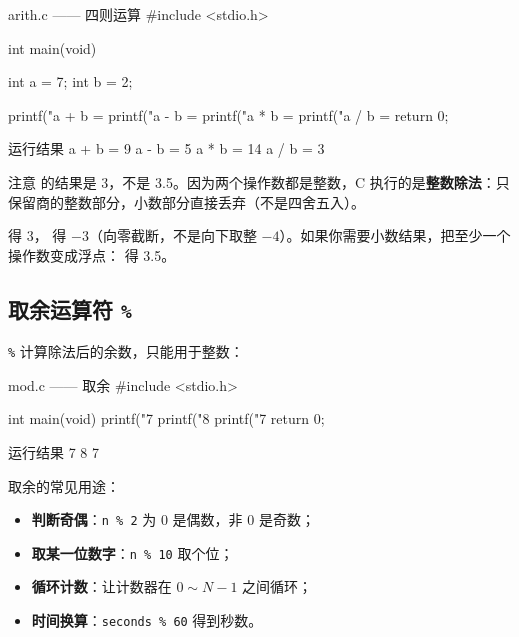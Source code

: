 \begin{codebox}{arith.c —— 四则运算}
#include <stdio.h>

int main(void)
{
    int a = 7;
    int b = 2;

    printf("a + b = %
    printf("a - b = %
    printf("a * b = %
    printf("a / b = %
    return 0;
}
\end{codebox}

\begin{outbox}{运行结果}
a + b = 9
a - b = 5
a * b = 14
a / b = 3
\end{outbox}

注意  的结果是 3，不是 3.5。因为两个操作数都是整数，C 执行的是\textbf{整数除法}：只保留商的整数部分，小数部分直接丢弃（不是四舍五入）。

\begin{pitfall}[整数除法向零截断]
 得 3， 得 $-3$（向零截断，不是向下取整 $-4$）。如果你需要小数结果，把至少一个操作数变成浮点： 得 3.5。
\end{pitfall}

\subsection{取余运算符 \texttt{\%}}

\texttt{\%} 计算除法后的余数，只能用于整数：

\begin{codebox}{mod.c —— 取余}
#include <stdio.h>

int main(void)
{
    printf("7 %
    printf("8 %
    printf("7 %
    return 0;
}
\end{codebox}

\begin{outbox}{运行结果}
7 %
8 %
7 %
\end{outbox}

取余的常见用途：

\begin{itemize}
  \item \textbf{判断奇偶}：\texttt{n \% 2} 为 0 是偶数，非 0 是奇数；
  \item \textbf{取某一位数字}：\texttt{n \% 10} 取个位；
  \item \textbf{循环计数}：让计数器在 $0 \sim N-1$ 之间循环；
  \item \textbf{时间换算}：\texttt{seconds \% 60} 得到秒数。
\end{itemize}

